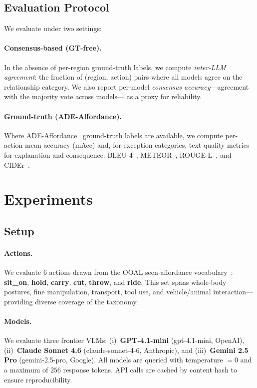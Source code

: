 \documentclass[runningheads]{llncs}
\newcommand{\numactions}{6}
\begin{document}
\subsection{Evaluation Protocol}
\label{sec:eval}

We evaluate under two settings:

\paragraph{Consensus-based (GT-free).}
In the absence of per-region ground-truth labels, we compute
\emph{inter-LLM agreement}: the fraction of (region, action) pairs where
all models agree on the relationship category. We also report per-model
\emph{consensus accuracy}—agreement with the majority vote across models—
as a proxy for reliability.

\paragraph{Ground-truth (ADE-Affordance).}
Where ADE-Affordance~\cite{ade_affordance} ground-truth labels are
available, we compute per-action mean accuracy (mAcc) and, for exception
categories, text quality metrics for explanation and consequence:
BLEU-4~\cite{bleu}, METEOR~\cite{meteor}, ROUGE-L~\cite{rouge}, and
CIDEr~\cite{cider}.


\section{Experiments}
\label{sec:experiments}

\subsection{Setup}
\label{sec:setup}

\paragraph{Actions.}
We evaluate \numactions{} actions drawn from the OOAL seen-affordance
vocabulary~\cite{ooal}: \textbf{sit\_on}, \textbf{hold}, \textbf{carry},
\textbf{cut}, \textbf{throw}, and \textbf{ride}. This set spans
whole-body postures, fine manipulation, transport, tool use, and
vehicle/animal interaction—providing diverse coverage of the taxonomy.

\paragraph{Models.}
We evaluate three frontier VLMs: (i)~\textbf{GPT-4.1-mini}
(gpt-4.1-mini, OpenAI), (ii)~\textbf{Claude Sonnet 4.6}
(claude-sonnet-4-6, Anthropic), and (iii)~\textbf{Gemini 2.5 Pro}
(gemini-2.5-pro, Google). All models are queried with temperature $= 0$
and a maximum of $256$ response tokens. API calls are cached by
content hash to ensure reproducibility.
\end{document}
